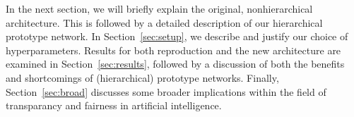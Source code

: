 In the next section, we will briefly explain the original, nonhierarchical architecture. This is followed by a detailed description of our hierarchical prototype network. In Section~\ref{sec:setup}, we describe and justify our choice of hyperparameters. Results for both reproduction and the new architecture are examined in Section~\ref{sec:results}, followed by a discussion of both the benefits and shortcomings of (hierarchical) prototype networks. Finally, Section~\ref{sec:broad} discusses some broader implications within the field of transparancy and fairness in artificial intelligence. 

